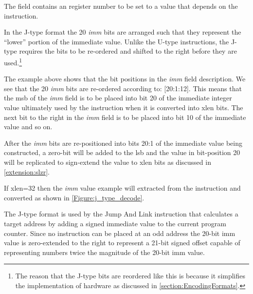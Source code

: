 
The  field contains an  register number to be set to a value that
depends on the instruction.


In the J-type format the 20 {\em imm} bits are arranged such 
that they represent the ``lower'' portion of the immediate value.  Unlike 
the U-type 
instructions, the J-type requires the bits to be re-ordered and shifted 
to the right before they are used.\footnote{The reason that the J-type 
bits are reordered like this is because it simplifies the implementation of 
hardware as discussed in \autoref{section:EncodingFormats}.}

The example above shows that the bit positions in the {\em imm} field 
description.  We see that the 20 {\em imm} bits are re-ordered according to: 
[20:1:12].  
This means that the \acrshort{msb} of the {\em imm} field is to be placed 
into bit 20 of the immediate integer value ultimately used by the instruction 
when it is converted into \Gls{xlen} bits.  
The next bit to the right in the {\em imm} field is to be placed into bit 10 of 
the immediate value and so on.

After the {\em imm} bits are re-positioned into bits 20:1 of the immediate value
being constructed, a zero-bit will be added to the \acrshort{lsb} 
and the value in bit-position 20 will be replicated to sign-extend the 
value to \Gls{xlen} bits as discussed in \autoref{extension:slzr}.


If \Gls{xlen}=32 then the {\em imm} value example will extracted from the instruction
and converted as shown in \autoref{Figure:j_type_decode}.

\begin{figure}[ht]
\centering
\DrawInsnOpJTypeDecoding
{}
\label{Figure:j_type_decode}
\label{imm.j:decode}
\end{figure}


%
%
%
%

The J-type format is used by the Jump And Link instruction that calculates 
a target address by adding a signed immediate value to the current program 
counter.  Since no instruction can be placed at an odd address the 20-bit 
imm value is zero-extended to the right to represent a 21-bit signed offset 
capable of representing numbers twice the magnitude of the 20-bit imm value.

